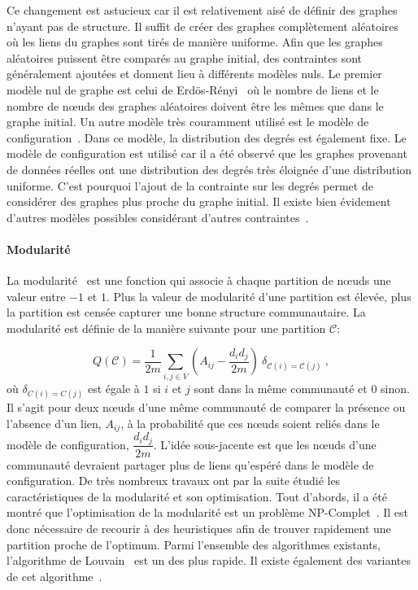 Ce changement est astucieux car il est relativement aisé de définir des graphes n'ayant pas de structure.
Il suffit de créer des graphes complètement aléatoires~\cite{Erdos1959} où les liens du graphes sont tirés de manière uniforme.
Afin que les graphes aléatoires puissent être comparés au graphe initial, des contraintes sont généralement ajoutées et donnent lieu à différents modèles nuls.
Le premier modèle nul de graphe est celui de Erdös-Rényi~\cite{Erdos1959} où le nombre de liens et le nombre de n\oe{}uds des graphes aléatoires doivent être les mêmes que dans le graphe initial.
Un autre modèle très couramment utilisé est le modèle de configuration~\cite{Bender1978a}.
Dans ce modèle, la distribution des degrés est également fixe.
Le modèle de configuration est utilisé car il a été observé que les graphes provenant de données réelles ont une distribution des degrés très éloignée d'une distribution uniforme.
C'est pourquoi l'ajout de la contrainte sur les degrés permet de considérer des graphes plus proche du graphe initial. 
Il existe bien évidement d'autres modèles possibles considérant d'autres contraintes~\cite{Newman2009}.

\paragraph{Modularité}
La modularité~\cite{Newman2004} est une fonction qui associe à chaque partition de n\oe{}uds une valeur entre $-1$ et $1$.
Plus la valeur de modularité d'une partition est élevée, plus la partition est censée capturer une bonne structure communautaire.
La modularité est définie de la manière suivante pour une partition $\mathcal{C}$:

\begin{equation}
Q(\mathcal{C}) = \dfrac{1}{2m}\sum_{i,j \in V} \left(A_{ij} - \dfrac{d_id_j}{2m}\right)\ \delta_{\mathcal{C}(i)=\mathcal{C}(j)} \ ,
\end{equation}
où $\delta_{C(i)=C(j)}$ est égale à $1$ si $i$ et $j$ sont dans la même communauté et $0$ sinon.
Il s'agit pour deux n\oe{}uds d'une même communauté de comparer la présence ou l'absence d'un lien, $A_{ij}$, à la probabilité que ces n\oe{}uds soient reliés dans le modèle de configuration, $\dfrac{d_id_j}{2m}$.
L'idée sous-jacente est que les n\oe{}uds d'une communauté devraient partager plus de liens qu'espéré dans le modèle de configuration.
De très nombreux travaux ont par la suite étudié les caractéristiques de la modularité et son optimisation.
Tout d'abords, il a été montré que l'optimisation de la modularité est un problème NP-Complet~\cite{Brandes2007}.
Il est donc nécessaire de recourir à des heuristiques afin de trouver rapidement une partition proche de l'optimum.
Parmi l'ensemble des algorithmes existants, l'algorithme de Louvain~\cite{Blondel2008a} est un des plus rapide.
Il existe également des variantes de cet algorithme~\cite{Huang2015,Traag2015c}.

